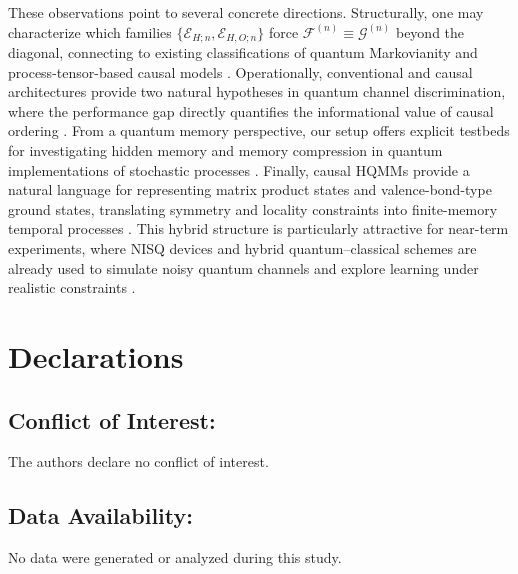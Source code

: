 \documentclass[11pt, reco]{article}
\begin{document}
These observations point to several concrete directions. Structurally, one may characterize which families $\{\mathcal{E}_{H;n}, \mathcal{E}_{H,O;n}\}$ force $\mathcal{F}^{(n)} \equiv \mathcal{G}^{(n)}$ beyond the diagonal, connecting to existing classifications of quantum Markovianity and process-tensor-based causal models \cite{MilzStrasberg21,WechsEtAl21b}. Operationally, conventional and causal architectures provide two natural hypotheses in quantum channel discrimination, where the performance gap directly quantifies the informational value of causal ordering \cite{PLLP19}. From a quantum memory perspective, our setup offers explicit testbeds for investigating hidden memory and memory compression in quantum implementations of stochastic processes \cite{TaElM,Elliot21}. Finally, causal HQMMs provide a natural language for representing matrix product states and valence-bond-type ground states, translating symmetry and locality constraints into finite-memory temporal processes \cite{AGLS24Q,Sou25}. This hybrid structure is particularly attractive for near-term experiments, where NISQ devices and hybrid quantum–classical schemes are already used to simulate noisy quantum channels and explore learning under realistic constraints \cite{David24,De22}.




\section*{Declarations}

\subsection*{Conflict of Interest:}
The authors declare no conflict of interest.

\subsection*{Data Availability:}
No data were generated or analyzed during this study.


\end{document}
